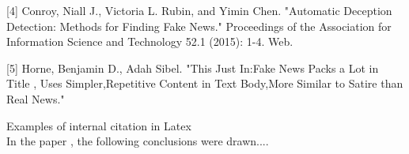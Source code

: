 \documentclass{article}
\begin{document}
[4] Conroy, Niall J., Victoria L. Rubin, and Yimin Chen. "Automatic Deception Detection: Methods for Finding Fake News." Proceedings of the Association for Information Science and Technology 52.1 (2015): 1-4. Web.

[5] Horne, Benjamin D., Adah Sibel. "This Just In:Fake News Packs a Lot in Title , Uses Simpler,Repetitive Content in Text Body,More Similar to Satire than Real News." 

  
Examples of internal citation in Latex \\
In the paper \cite{pls2}, the following conclusions were drawn....
 
  
\medskip


\end{document}

